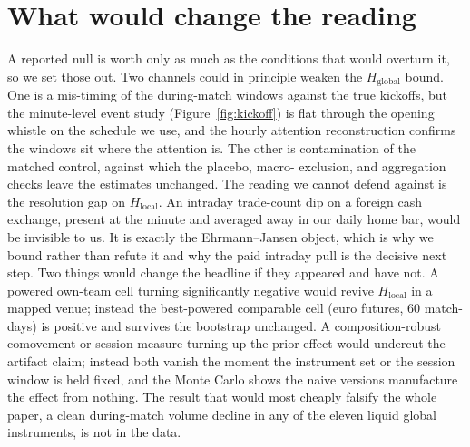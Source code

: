 \documentclass[12pt]{article}
\begin{document}
\section{What would change the reading}\label{sec:deflate}
A reported null is worth only as much as the conditions that would overturn it, so we set those out. Two channels could in
principle weaken the $H_{\text{global}}$ bound. One is a mis-timing of the during-match windows against
the true kickoffs, but the minute-level event study (Figure~\ref{fig:kickoff}) is flat through the
opening whistle on the schedule we use, and the hourly attention reconstruction confirms the windows sit
where the attention is. The other is contamination of the matched control, against which the placebo, macro-
exclusion, and aggregation checks leave the estimates unchanged. The reading we cannot defend against
is the resolution gap on $H_{\text{local}}$. An intraday trade-count dip on a foreign cash exchange,
present at the minute and averaged away in our daily home bar, would be invisible to us. It is exactly the
Ehrmann--Jansen object, which is why we bound rather than refute it and why the paid intraday pull is the
decisive next step. Two things would change the headline if they appeared and have not. A powered own-team
cell turning significantly negative would revive $H_{\text{local}}$ in a mapped venue; instead the
best-powered comparable cell (euro futures, 60 match-days) is positive and survives the bootstrap
unchanged. A composition-robust comovement or session measure turning up the prior effect would
undercut the artifact claim; instead both vanish the moment the instrument set or the session window is
held fixed, and the Monte Carlo shows the naive versions manufacture the effect from nothing. The result
that would most cheaply falsify the whole paper, a clean during-match volume decline in any of the eleven
liquid global instruments, is not in the data.
\end{document}
